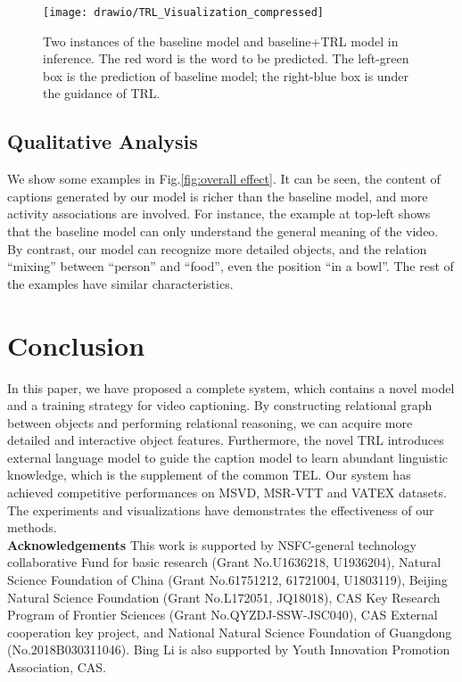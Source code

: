 \documentclass[10pt,twocolumn,letterpaper]{article}
\begin{document}
\begin{figure}
	\centering
	\texttt{[image: drawio/TRL\_Visualization\_compressed]}
	\caption{Two instances of the baseline model and baseline+TRL model in inference. The red word is the word to be predicted. The left-green box is the prediction of baseline model; the right-blue box is under the guidance of TRL.}
	\label{fig:trl_analysis}
	\vspace{-0.7cm}
\end{figure}

\subsection{Qualitative Analysis}
We show some examples in Fig.\ref{fig:overall effect}. It can be seen, the content of captions generated by our model is richer than the baseline model, and more activity associations are involved. For instance, the example at top-left shows that the baseline model can only understand the general meaning of the video. By contrast, our model can recognize more detailed objects, and the relation ``mixing'' between ``person'' and ``food'', even the position ``in a bowl''. The rest of the examples have similar characteristics.
\section{Conclusion}
In this paper, we have proposed a complete system, which contains a novel model and a training strategy for video captioning. By constructing relational graph between objects and performing relational reasoning, we can acquire more detailed and interactive object features. Furthermore, the novel TRL introduces external language model to guide the caption model to learn abundant linguistic knowledge, which is the supplement of the common TEL. Our system has achieved competitive performances on MSVD, MSR-VTT and VATEX datasets. The experiments and visualizations have demonstrates the effectiveness of our methods.\\
\textbf{Acknowledgements} This work is supported by NSFC-general technology collaborative Fund for basic research (Grant No.U1636218, U1936204), Natural Science Foundation of China (Grant No.61751212, 61721004, U1803119), Beijing Natural Science Foundation (Grant No.L172051, JQ18018), CAS Key Research Program of Frontier Sciences (Grant No.QYZDJ-SSW-JSC040), CAS External cooperation key project, and National Natural Science Foundation of Guangdong (No.2018B030311046). Bing Li is also supported by Youth Innovation Promotion Association, CAS.

{\small
	
	
}
\end{document}
